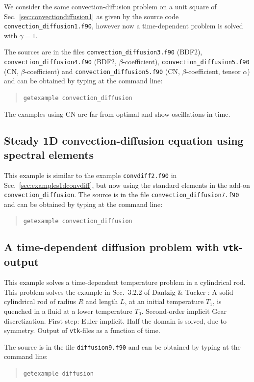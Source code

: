 We consider the same 
convection-diffusion problem on a unit square
of Sec.~\ref{sec:convectiondiffusion1} as given by
the source code \texttt{convection\_diffusion1.f90}, however
now a time-dependent problem is solved with $\gamma=1$.

The sources are
in the files \texttt{convection\_diffusion3.f90} (BDF2),
\texttt{convection\_diffusion4.f90} (BDF2, $\beta$-coefficient),
\texttt{convection\_diffusion5.f90} (CN, $\beta$-coefficient) and
\texttt{convection\_diffusion5.f90} (CN, $\beta$-coefficient, tensor $\alpha$) 
and can be obtained by typing at the
command line:
\begin{quote}
   \texttt{getexample convection\_diffusion}
\end{quote}
The examples using CN are far from optimal and show oscillations in time.

\subsection{Steady 1D convection-diffusion equation using spectral elements}
\label{sec:convdiff1D}
This example is similar to the example \texttt{convdiff2.f90}
in Sec.~\ref{sec:examples1dconvdiff}, but now using the standard elements in the add-on
\texttt{convection\_diffusion}.
The source is in the file \texttt{convection\_diffusion7.f90}
and can be obtained by typing at the
command line:
\begin{quote}
   \texttt{getexample convection\_diffusion}
\end{quote}

\subsection{A time-dependent diffusion problem with \texttt{vtk}-output}

This example solves a time-dependent temperature problem in a cylindrical rod.
This problem solves the example in Sec.~3.2.2 of Dantzig \& Tucker \cite{Dantzig2001}:
A solid cylindrical rod of radius $R$ and length $L$, at an initial
temperature $T_1$, is quenched in a fluid at a lower temperature $T_0$.
Second-order implicit Gear discretization. First step: Euler implicit.
Half the domain is solved, due to symmetry.
Output of \texttt{vtk}-files as a function of time.

The source is in the file \texttt{diffusion9.f90}
and can be obtained by typing at the
command line:
\begin{quote}
   \texttt{getexample diffusion}
\end{quote}


